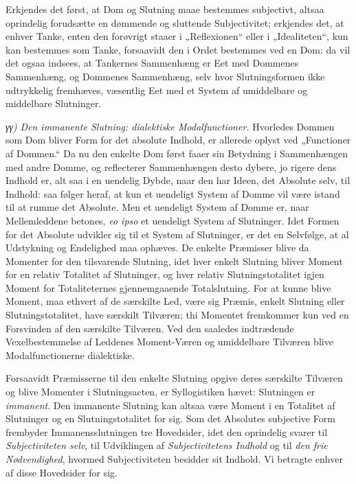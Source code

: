 \documentclass[12pt]{book}
\newcommand{\opage}[1]{\marginnote{\footnotesize\textit{[#1]}}}
\begin{document}
Erkjendes det først, at Dom og Slutning maae bestemmes subjectivt, altsaa oprindelig forudsætte en dømmende og sluttende Subjectivitet; erkjendes det, at enhver Tanke, enten den forøvrigt staaer i „Reflexionen“ eller i „Idealiteten“, kun kan bestemmes som Tanke, forsaavidt den i Ordet bestemmes ved en Dom: da vil det ogsaa indsees, at Tankernes Sammenhæng er Eet med Dommenes Sammenhæng, og Dommenes Sammenhæng, selv hvor Slutningsformen ikke udtrykkelig fremhæves, væsentlig Eet med et System af umiddelbare og middelbare Slutninger.

\textit{γγ)} \emph{Den immanente Slutning: dialektiske Modalfunctioner.} Hvorledes Dommen som Dom bliver Form for det absolute Indhold, er allerede oplyst ved „Functioner af Dommen.“ Da nu den enkelte Dom først faaer sin Betydning i Sammenhængen med andre Domme, og reflecterer Sammenhængen desto dybere, jo rigere dens Indhold er, alt%
\opage{330}saa i en uendelig Dybde, naar den har Ideen, det Absolute selv, til Indhold: saa følger heraf, at kun et uendeligt System af Domme vil være istand til at rumme det Absolute. Men et uendeligt System af Domme er, naar Mellemleddene betones, \textit{eo ipso} et uendeligt System af Slutninger. Idet Formen for det Absolute udvikler sig til et System af Slutninger, er det en Selvfølge, at al Udstykning og Endelighed maa ophæves. De enkelte Præmisser blive da Momenter for den tilsvarende Slutning, idet hver enkelt Slutning bliver Moment for en relativ Totalitet af Slutninger, og hver relativ Slutningstotalitet igjen Moment for Totaliteternes gjennemgaaende Totalslutning. For at kunne blive Moment, maa ethvert af de særskilte Led, være sig Præmis, enkelt Slutning eller Slutningstotalitet, have særskilt Tilværen; thi Momentet fremkommer kun ved en Forsvinden af den særskilte Tilværen. Ved den saaledes indtrædende Vexelbestemmelse af Leddenes Moment-Væren og umiddelbare Tilværen blive Modalfunctionerne dialektiske.

Forsaavidt Præmisserne til den enkelte Slutning opgive deres særskilte Tilværen og blive Momenter i Slutningsacten, er Syllogistiken hævet: Slutningen er \emph{immanent}. Den immanente Slutning kan altsaa være Moment i en Totalitet af Slutninger og en Slutningstotalitet for sig. Som det Absolutes subjective Form frembyder Immanensslutningen tre Hovedsider, idet den oprindelig svarer til \emph{Subjectiviteten selv}, til Udviklingen af \emph{Subjectivitetens Indhold} og til \emph{den frie Nødvendighed}, hvormed Subjectiviteten besidder sit Indhold. Vi betragte enhver af disse Hovedsider for sig.
\end{document}
